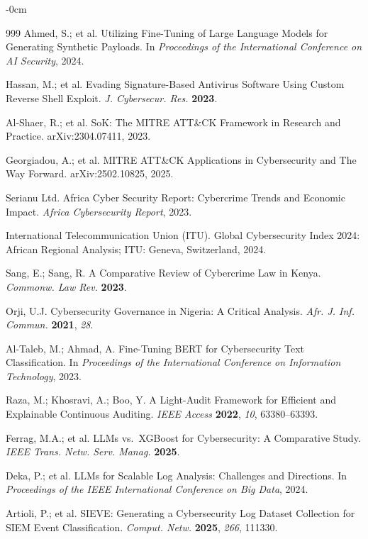 \documentclass[futureinternet,article,submit,pdftex,moreauthors]{Definitions/mdpi}
\begin{document}
\begin{adjustwidth}{-\extralength}{0cm}
\begin{thebibliography}{999}
Ahmed, S.; et al. Utilizing Fine-Tuning of Large Language Models for Generating Synthetic
Payloads. In \textit{Proceedings of the International Conference on AI Security}, 2024.

Hassan, M.; et al. Evading Signature-Based Antivirus Software Using Custom Reverse Shell
Exploit. \textit{J. Cybersecur. Res.} \textbf{2023}.

Al-Shaer, R.; et al. SoK: The MITRE ATT\&CK Framework in Research and Practice.
arXiv:2304.07411, 2023.

Georgiadou, A.; et al. MITRE ATT\&CK Applications in Cybersecurity and The Way Forward.
arXiv:2502.10825, 2025.

Serianu Ltd. Africa Cyber Security Report: Cybercrime Trends and Economic Impact.
\textit{Africa Cybersecurity Report}, 2023.

International Telecommunication Union (ITU). Global Cybersecurity Index 2024: African
Regional Analysis; ITU: Geneva, Switzerland, 2024.

Sang, E.; Sang, R. A Comparative Review of Cybercrime Law in Kenya.
\textit{Commonw. Law Rev.} \textbf{2023}.

Orji, U.J. Cybersecurity Governance in Nigeria: A Critical Analysis.
\textit{Afr. J. Inf. Commun.} \textbf{2021}, \textit{28}.

Al-Taleb, M.; Ahmad, A. Fine-Tuning BERT for Cybersecurity Text Classification.
In \textit{Proceedings of the International Conference on Information Technology}, 2023.

Raza, M.; Khosravi, A.; Boo, Y. A Light-Audit Framework for Efficient and Explainable
Continuous Auditing. \textit{IEEE Access} \textbf{2022}, \textit{10}, 63380--63393.

Ferrag, M.A.; et al. LLMs vs.\ XGBoost for Cybersecurity: A Comparative Study.
\textit{IEEE Trans. Netw. Serv. Manag.} \textbf{2025}.

Deka, P.; et al. LLMs for Scalable Log Analysis: Challenges and Directions.
In \textit{Proceedings of the IEEE International Conference on Big Data}, 2024.

Artioli, P.; et al. SIEVE: Generating a Cybersecurity Log Dataset Collection for SIEM
Event Classification. \textit{Comput. Netw.} \textbf{2025}, \textit{266}, 111330.


\end{thebibliography}
\end{adjustwidth}
\end{document}
